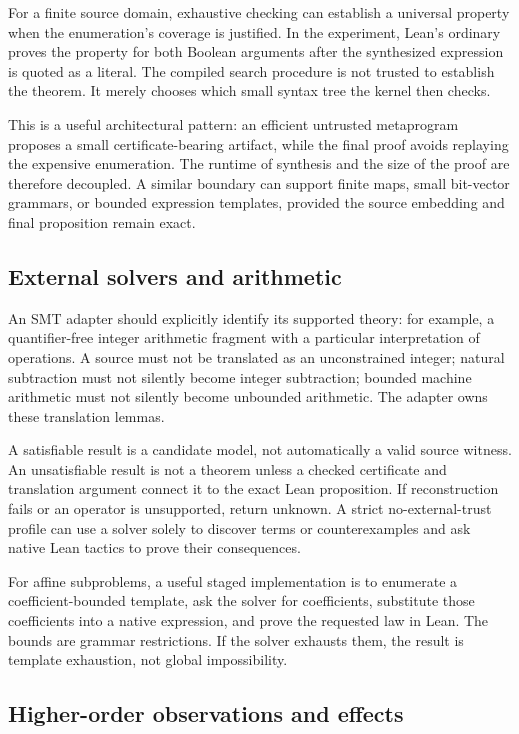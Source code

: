 For a finite source domain, exhaustive checking can establish a universal property when the enumeration's coverage is justified. In the experiment, Lean's ordinary  proves the property for both Boolean arguments after the synthesized expression is quoted as a literal. The compiled search procedure is not trusted to establish the theorem. It merely chooses which small syntax tree the kernel then checks.

This is a useful architectural pattern: an efficient untrusted metaprogram proposes a small certificate-bearing artifact, while the final proof avoids replaying the expensive enumeration. The runtime of synthesis and the size of the proof are therefore decoupled. A similar boundary can support finite maps, small bit-vector grammars, or bounded expression templates, provided the source embedding and final proposition remain exact.

\subsection{External solvers and arithmetic}

An SMT adapter should explicitly identify its supported theory: for example, a quantifier-free integer arithmetic fragment with a particular interpretation of operations. A source  must not be translated as an unconstrained integer; natural subtraction must not silently become integer subtraction; bounded machine arithmetic must not silently become unbounded arithmetic. The adapter owns these translation lemmas.

A satisfiable result is a candidate model, not automatically a valid source witness. An unsatisfiable result is not a theorem unless a checked certificate and translation argument connect it to the exact Lean proposition. If reconstruction fails or an operator is unsupported, return unknown. A strict no-external-trust profile can use a solver solely to discover terms or counterexamples and ask native Lean tactics to prove their consequences.

For affine subproblems, a useful staged implementation is to enumerate a coefficient-bounded template, ask the solver for coefficients, substitute those coefficients into a native expression, and prove the requested law in Lean. The bounds are grammar restrictions. If the solver exhausts them, the result is template exhaustion, not global impossibility.

\subsection{Higher-order observations and effects}

